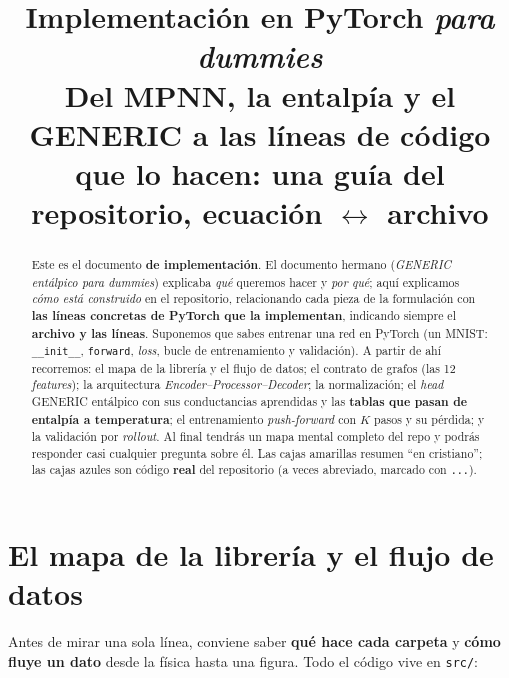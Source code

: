 \documentclass[11pt]{article}
\title{\bfseries Implementación en PyTorch \emph{para dummies}\\[4pt]
  \large Del MPNN, la entalpía y el GENERIC a las líneas de código\\
  que lo hacen: una guía del repositorio, ecuación $\leftrightarrow$ archivo}
\author{}
\date{}
\theoremstyle{definition}
\theoremstyle{plain}
\begin{document}
\maketitle

\begin{abstract}
\noindent
Este es el documento \textbf{de implementación}. El documento hermano
(\emph{GENERIC entálpico para dummies}) explicaba \emph{qué} queremos hacer y
\emph{por qué}; aquí explicamos \emph{cómo está construido} en el repositorio,
relacionando cada pieza de la formulación con \textbf{las líneas concretas de
PyTorch que la implementan}, indicando siempre el \textbf{archivo y las líneas}.
Suponemos que sabes entrenar una red en PyTorch (un MNIST: \texttt{\_\_init\_\_},
\texttt{forward}, \emph{loss}, bucle de entrenamiento y validación). A partir de
ahí recorremos: el mapa de la librería y el flujo de datos; el contrato de grafos
(las 12 \emph{features}); la arquitectura \emph{Encoder--Processor--Decoder}; la
normalización; el \emph{head} GENERIC entálpico con sus conductancias aprendidas y
las \textbf{tablas que pasan de entalpía a temperatura}; el entrenamiento
\emph{push-forward} con $K$ pasos y su pérdida; y la validación por \emph{rollout}.
Al final tendrás un mapa mental completo del repo y podrás responder casi cualquier
pregunta sobre él. Las cajas amarillas resumen ``en cristiano''; las cajas azules
son código \textbf{real} del repositorio (a veces abreviado, marcado con
\texttt{...}).
\end{abstract}

\tableofcontents
\bigskip

\section{El mapa de la librería y el flujo de datos}
\label{sec:mapa}

Antes de mirar una sola línea, conviene saber \textbf{qué hace cada carpeta} y
\textbf{cómo fluye un dato} desde la física hasta una figura. Todo el código vive
en \texttt{src/}:
\end{document}
